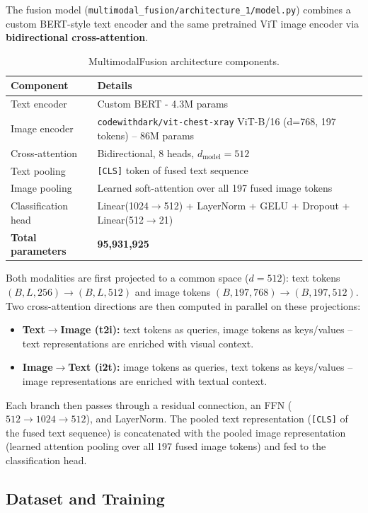 \documentclass[11pt]{article}
\begin{document}
The fusion model (\texttt{multimodal\_fusion/architecture\_1/model.py}) combines a
custom BERT-style text encoder and the same pretrained ViT image encoder via
\textbf{bidirectional cross-attention}.

\begin{table}[H]
\centering
\caption{MultimodalFusion architecture components.}
\begin{tabular}{ll}
\toprule
Component & Details \\
\midrule
Text encoder & Custom BERT - 4.3M params \\
Image encoder & \texttt{codewithdark/vit-chest-xray} ViT-B/16 (d=768, 197 tokens) -- 86M params \\
Cross-attention & Bidirectional, 8 heads, $d_{\text{model}}=512$ \\
Text pooling & \texttt{[CLS]} token of fused text sequence \\
Image pooling & Learned soft-attention over all 197 fused image tokens \\
Classification head & Linear(1024$\to$512) + LayerNorm + GELU + Dropout + Linear(512$\to$21) \\
\textbf{Total parameters} & \textbf{95{,}931{,}925} \\
\bottomrule
\end{tabular}
\end{table}

Both modalities are first projected to a common space ($d=512$):
text tokens $(B,L,256) \to (B,L,512)$ and image tokens $(B,197,768) \to
(B,197,512)$. Two cross-attention directions are then computed in parallel on
these projections:
\begin{itemize}
  \item \textbf{Text$\to$Image (t2i):} text tokens as queries, image tokens as
        keys/values -- text representations are enriched with visual context.
  \item \textbf{Image$\to$Text (i2t):} image tokens as queries, text tokens as
        keys/values -- image representations are enriched with textual context.
\end{itemize}
Each branch then passes through a residual connection, an FFN
($512\to1024\to512$), and LayerNorm. The pooled text representation
(\texttt{[CLS]} of the fused text sequence) is concatenated with the pooled image
representation (learned attention pooling over all 197 fused image tokens) and fed
to the classification head.

\subsection{Dataset and Training}
\end{document}
